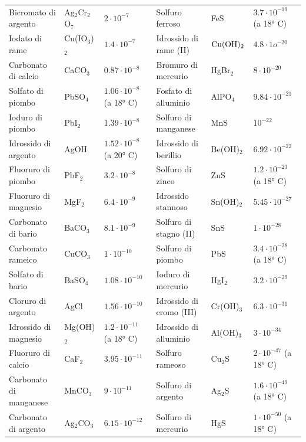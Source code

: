 \begin{tabular}{p{3.4cm}p{1.6cm}p{2.5cm}p{3.4cm}p{1.6cm}p{2.5cm}}
    Bicromato di argento & Ag$_2$Cr$_2$O$_7$ & $2 \cdot 10^{-7}$ & Solfuro ferroso & FeS & $3.7 \cdot 10^{-19}$ (a 18° C)\\[0.7ex]
    Iodato di rame & Cu(IO$_3$)$_2$ & $1.4 \cdot 10^{-7}$ & Idrossido di rame (II) & $\rm Cu(OH)_2$ & $4.8 \cdot 1o^{-20}$\\[0.7ex]
    Carbonato di calcio & CaCO$_3$ & $0.87 \cdot 10^{-8}$ & Bromuro di mercurio & HgBr$_2$ & $8 \cdot 10^{-20}$\\[0.7ex]
    Solfato di piombo & PbSO$_4$ & $1.06 \cdot 10^{-8}$ (a 18° C) & Fosfato di alluminio & AlPO$_4$ & $9.84 \cdot 10^{-21}$\\[0.7ex]
    Ioduro di piombo & PbI$_2$ & $1.39 \cdot 10^{-8}$ & Solfuro di manganese & MnS & $10^{-22}$\\[0.7ex]
    Idrossido di argento & AgOH & $1.52 \cdot 10^{-8}$ (a 20° C)& Idrossido di berillio & Be(OH)$_2$ & $6.92 \cdot 10^{-22}$\\[0.7ex]
    Fluoruro di piombo & PbF$_2$ & $3.2 \cdot 10^{-8}$ & Solfuro di zinco & ZnS & $1.2 \cdot 10^{-23}$ (a 18° C)\\[0.7ex]
    Fluoruro di magnesio & MgF$_2$ & $6.4 \cdot 10^{-9}$ & Idrossido stannoso & Sn(OH)$_2$ & $5.45 \cdot 10^{-27}$\\[0.7ex]
    Carbonato di bario & BaCO$_3$ & $8.1 \cdot 10^{-9}$ &Solfuro di stagno (II)  & SnS & $1 \cdot 10^{-28}$\\[0.7ex]
    Carbonato rameico & CuCO$_3$ & $1 \cdot 10^{-10}$ & Solfuro di piombo & PbS & $3.4 \cdot 10^{-28}$ (a 18° C)\\[0.7ex]
    Solfato di bario & BaSO$_4$ & $1.08 \cdot 10^{-10}$ & Ioduro di mercurio & HgI$_2$ & $3.2 \cdot 10^{-29}$ \\[0.7ex]
    Cloruro di argento & AgCl & $1.56 \cdot 10^{-10}$ & Idrossido di cromo (III) & Cr(OH)$_3$ & $6.3 \cdot 10^{-31}$\\[0.7ex]
    Idrossido di magnesio & Mg(OH)$_2$ & $1.2 \cdot 10^{-11}$ (a 18° C) & Idrossido di alluminio & Al(OH)$_3$ & $3 \cdot 10^{-34}$\\[0.7ex]
    Fluoruro di calcio & CaF$_2$ & $3.95 \cdot 10^{-11}$ & Solfuro rameoso & Cu$_2$S & $2 \cdot 10^{-47}$ (a 18° C)\\[0.7ex]
    Carbonato di manganese & MnCO$_3$ & $9 \cdot 10^{-11}$ & Solfuro di argento & Ag$_2$S & $1.6 \cdot 10^{-49}$ (a 18° C)\\[0.7ex]
    Carbonato di argento & Ag$_2$CO$_3$ & $6.15 \cdot 10^{-12}$ & Solfuro di mercurio & HgS & $1 \cdot 10^{-50}$ (a 18° C)\\[0.7ex]

\end{tabular}

